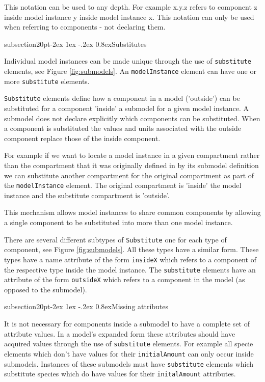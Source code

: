 \documentclass[10pt]{article}
\makeatletter
\renewcommand{\subsection}{\@startsection%
  {subsection}{2}{0pt}{-2ex \@plus 1ex \@minus -.2ex}%
  {0.8ex}{\slshape\large\bfseries\sffamily}}
\newcommand{\class}[1]{\texttt{#1}}
\newcommand{\attrib}[1]{\texttt{#1}}
\makeatother
\begin{document}
This notation can be used to any depth.  For example x.y.z refers
to component z inside model instance y inside model instance x. This notation
can only be used when referring to components - not declaring
them.

\subsection{Substitutes}

Individual model instances can be made unique through the use of
\class{substitute} elements, see Figure \ref{fig:submodels}. An
\class{modelInstance} element can have one or more \class{substitute}
elements.

\class{Substitute} elements define how a component in a model
('outside') can be substituted for a component 'inside' a
submodel for a given model instance. A submodel does not declare
explicitly which components can be substituted.  When a component
is substituted the values and units associated with the outside
component replace those of the inside component.

For example if we want to locate a model instance in a given
compartment rather than the compartment that it was originally
defined in by its submodel definition we can substitute another
compartment for the original compartment as part of the
\class{modelInstance} element.  The original compartment is 'inside'
the model instance and the substitute compartment is 'outside'.

This mechanism allows model instances to share common components by
allowing a single component to be substituted into more than one
model instance.

There are several different subtypes of \class{Substitute} one for
each type of component, see Figure \ref{fig:submodels}.  All
these types have a similar form. These types have a name
attribute of the form \attrib{insideX} which refers to a
component of the respective type inside the model instance. The
\class{substitute} elements have an attribute of the form
\attrib{outsideX} which refers to a component in the model (as
opposed to the submodel).

\subsection{Missing attributes}

It is not necessary for components inside a submodel to have a
complete set of attribute values. In a model's expanded form
these attributes should have acquired values through the use of
\class{substitute} elements.  For example all specie elements which don't
have values for their \attrib{initialAmount} can only occur
inside submodels.  Instances of these submodels must have
\class{substitute} elements which substitute species which do have values
for their \attrib{initalAmount} attributes.
\end{document}
